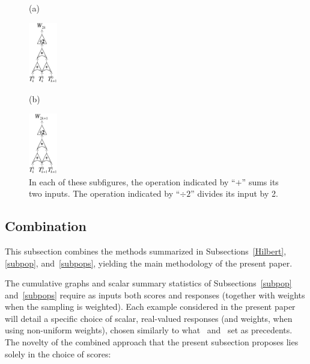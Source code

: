 \documentclass{article}
\begin{document}
\begin{figure}
\vspace{.2in}
\begin{centering}
\hfil
(a) \parbox{0.111\textwidth}
{\includegraphics[width=0.111\textwidth]{./sums0.pdf}}
\hfil
(b) \parbox{0.111\textwidth}
{\includegraphics[width=0.111\textwidth]{./sums1.pdf}}
\end{centering}
\caption{In each of these subfigures, the operation indicated by ``$+$'' sums
its two inputs. The operation indicated by ``$\div 2$'' divides its input by 2.
}
\label{sums}
\end{figure}


\subsection{Combination}
\label{combo}

This subsection combines the methods summarized
in Subsections~\ref{Hilbert}, \ref{subpop}, and~\ref{subpops},
yielding the main methodology of the present paper.

The cumulative graphs and scalar summary statistics
of Subsections~\ref{subpop} and~\ref{subpops}
require as inputs both scores and responses
(together with weights when the sampling is weighted).
Each example considered in the present paper
will detail a specific choice of scalar, real-valued responses (and weights,
when using non-uniform weights), chosen similarly to what~\cite{tygert_full}
and~\cite{tygert_two} set as precedents.
The novelty of the combined approach that the present subsection proposes
lies solely in the choice of scores:
\end{document}
